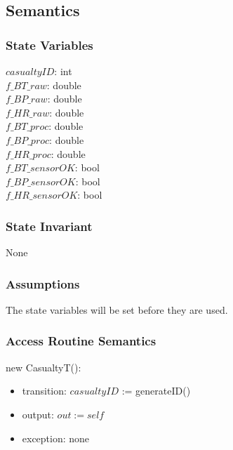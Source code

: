 \documentclass{article}
\begin{document}
\begin{description}
\begin{tabular}{| l | l | l | p{5cm} |}
          
        \end{tabular}
        
        \subsection* {Semantics}
        
        \subsubsection* {State Variables}
        
        $\mathit{casualtyID}$: int \\
        $\mathit{f\_BT\_raw}$: double \\
        $\mathit{f\_BP\_raw}$: double \\
        $\mathit{f\_HR\_raw}$: double \\
        $\mathit{f\_BT\_proc}$: double\\
        $\mathit{f\_BP\_proc}$: double \\
        $\mathit{f\_HR\_proc}$: double \\
        $\mathit{f\_BT\_sensorOK}$: bool\\
        $\mathit{f\_BP\_sensorOK}$: bool \\
        $\mathit{f\_HR\_sensorOK}$: bool \\
        
        \subsubsection* {State Invariant}
        
        None
        
        \subsubsection* {Assumptions}
        
        The state variables will be set before they are used.
        
        \subsubsection* {Access Routine Semantics}
        
        \noindent new CasualtyT():
        \begin{itemize}
        \item transition: $\mathit{casualtyID}$ := generateID()
        \item output: $out := \mathit{self}$
        \item exception: none
        \end{itemize}
        

\end{description}
\end{document}
